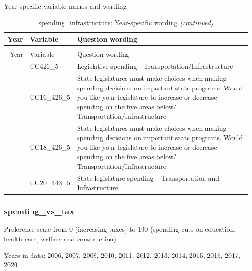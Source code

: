 \documentclass[
  12pt]{article}
\begin{document}
Year-specific variable names and
wording\begingroup\fontsize{11}{13}\selectfont

\begin{longtable}[t]{rl>{\raggedright\arraybackslash}p{10cm}}
\caption{\label{tab:unnamed-chunk-5}spending\_infrastructure: Year-specific wording}\\
\toprule
Year & Variable & Question wording\\
\midrule
\endfirsthead
\caption[]{spending\_infrastructure: Year-specific wording \textit{(continued)}}\\
\toprule
Year & Variable & Question wording\\
\midrule
\endhead

\endfoot
\bottomrule
\endlastfoot
2014 & CC426\_5 & Legislative spending - Transportation/Infrastructure\\
\addlinespace
2016 & CC16\_426\_5 & State legislatures must make choices when making spending decisions on important state programs. Would you like your legislature to increase or decrease spending on the five areas below? Transportation/Infrastructure\\
\addlinespace
2018 & CC18\_426\_5 & State legislatures must make choices when making spending decisions on important state programs. Would you like your legislature to increase or decrease spending on the five areas below? Transportation/Infrastructure\\
\addlinespace
2020 & CC20\_443\_5 & State legislature spending -- Transportation and Infrastructure\\*
\end{longtable}
\endgroup{}

\hypertarget{spending_vs_tax}{%
\subsubsection{spending\_vs\_tax}\label{spending_vs_tax}}

Preference scale from 0 (increasing taxes) to 100 (spending cuts on
education, health care, welfare and construction)

Years in data: 2006, 2007, 2008, 2010, 2011, 2012, 2013, 2014, 2015,
2016, 2017, 2020
\end{document}
